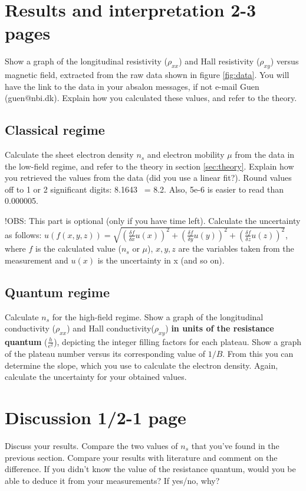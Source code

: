 \documentclass[a4paper]{article}
\begin{document}
\section{Results and interpretation 2-3 pages}
Show a graph of the longitudinal resistivity ($\rho_{xx}$) and Hall resistivity ($\rho_{xy}$) versus magnetic field, extracted from the raw data shown in figure \ref{fig:data}. You will have the link to the data in your absalon messages, if not e-mail Guen (guen@nbi.dk). Explain how you calculated these values, and refer to the theory.


\subsection{Classical regime}
Calculate the sheet electron density $n_{s}$ and electron mobility $\mu$ from the data in the low-field regime, and refer to the theory in section \ref{sec:theory}. Explain how you retrieved the values from the data (did you use a linear fit?).
Round values off to 1 or 2 significant digits: 8.1643 ~= 8.2. Also, 5e-6 is easier to read than 0.000005.

!OBS: This part is optional (only if you have time left).
Calculate the uncertainty as follows: \newline $u(f(x, y, z)) = \sqrt{(\frac{\delta f}{\delta{x}} u(x))^{2} + (\frac{\delta f}{\delta{y}} u(y))^{2} + (\frac{\delta f}{\delta{z}} u(z))^{2}}$, where $f$ is the calculated value ($n_{s}$ or $\mu$), $x, y, z$ are the variables taken from the measurement and $u(x)$ is the uncertainty in x (and so on).

\subsection{Quantum regime}
Calculate $n_{s}$ for the high-field regime.
Show a graph of the longitudinal conductivity ($\rho_{xx}$) and Hall conductivity($\rho_{xy}$) \textbf{in units of the resistance quantum} ($\frac{h}{e^{2}}$), depicting the integer filling factors for each plateau.
Show a graph of the plateau number versus its corresponding value of $1/B$. From this you can determine the slope, which you use to calculate the electron density.
Again, calculate the uncertainty for your obtained values.

\section{Discussion 1/2-1 page}
Discuss your results. Compare the two values of $n_{s}$ that you've found in the previous section. Compare your results with literature and comment on the difference. If you didn't know the value of the resistance quantum, would you be able to deduce it from your measurements? If yes/no, why?
\end{document}
